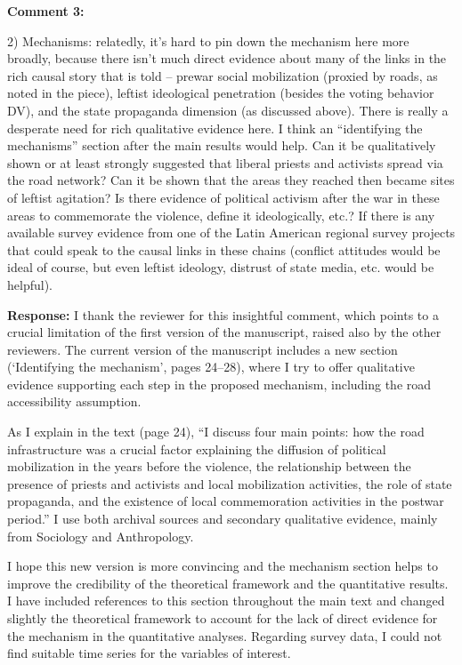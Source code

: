 \documentclass[12pt, a4paper, notitlepage]{article}
\begin{document}
\vspace{15pt}
\noindent\textbf{Comment 3:}
\begin{displayquote}
2) Mechanisms: relatedly, it’s hard to pin down the mechanism here more broadly, because there isn’t much direct evidence about many of the links in the rich causal story that is told – prewar social mobilization (proxied by roads, as noted in the piece), leftist ideological penetration (besides the voting behavior DV), and the state propaganda dimension (as discussed above). There is really a desperate need for rich qualitative evidence here. I think an “identifying the mechanisms” section after the main results would help. Can it be qualitatively shown or at least strongly suggested that liberal priests and activists spread via the road network? Can it be shown that the areas they reached then became sites of leftist agitation? Is there evidence of political activism after the war in these areas to commemorate the violence, define it ideologically, etc.? If there is any available survey evidence from one of the Latin American regional survey projects that could speak to the causal links in these chains (conflict attitudes would be ideal of course, but even leftist ideology, distrust of state media, etc. would be helpful).
\end{displayquote}

\noindent\textbf{Response:} I thank the reviewer for this insightful comment, which points to a crucial limitation of the first version of the manuscript, raised also by the other reviewers.
The current version of the manuscript includes a new section (`Identifying the mechanism', pages 24--28), where I try to offer qualitative evidence supporting each step in the proposed mechanism, including the road accessibility assumption.

As I explain in the text (page 24), ``I discuss four main points: how the road infrastructure was a crucial factor explaining the diffusion of political mobilization in the years before the violence, the relationship between the presence of priests and activists and local mobilization activities, the role of state propaganda, and the existence of local commemoration activities in the postwar period.'' I use both archival sources and secondary qualitative evidence, mainly from Sociology and Anthropology.

I hope this new version is more convincing and the mechanism section helps to improve the credibility of the theoretical framework and the quantitative results.
I have included references to this section throughout the main text and changed slightly the theoretical framework to account for the lack of direct evidence for the mechanism in the quantitative analyses.
Regarding survey data, I could not find suitable time series for the variables of interest.
\end{document}
